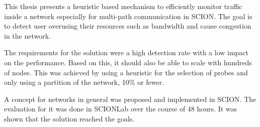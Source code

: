 \documentclass[thesis.tex]{subfiles}
\begin{document}
This thesis presents a heuristic based mechanism to efficiently monitor traffic inside a network especially for multi-path communication in SCION. The goal is to detect user overusing their resources such as bandwidth and cause congestion in the network. 

The requirements for the solution were a high detection rate with a low impact on the performance. Based on this, it should also be able to scale with hundreds of nodes. This was achieved by using a heuristic for the selection of probes and only using a partition of the network, 10\% or fewer.

A concept for networks in general was proposed and implemented in SCION. The evaluation for it was done in SCIONLab over the course of 48 hours. It was shown that the solution reached the goals.
\end{document}
